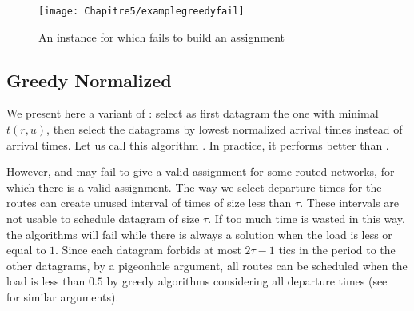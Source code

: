 %    

   \begin{figure} 
	\centering
	\texttt{[image: Chapitre5/examplegreedyfail]}
\caption{An instance for which \greedydeadline fails to build an assignment}
\label{fig:examplegreedyfail}   
\end{figure}
\subsection{Greedy Normalized}

We present here a variant of \greedydeadline: select as first datagram the one with minimal $t(r,u)$, then select the datagrams by lowest normalized arrival times instead of arrival times. Let us call this algorithm
\greedynormalized. In practice, it performs better than \greedydeadline.

However, \greedydeadline and \greedynormalized may fail to give a valid assignment for some routed networks, for which there is a valid assignment. The way we select departure times for the routes can create unused interval of times of size less than $\tau$. These intervals are not usable to schedule datagram of size $\tau$. If too much time is wasted in this way, the algorithms will fail while there is always a solution when the load is less or equal to $1$. Since each datagram forbids at most $2\tau -1$ tics in the period to the other datagrams, by a pigeonhole argument, all routes can be scheduled when the load is less than $0.5$ by greedy algorithms considering all departure times (see~ for similar arguments).

